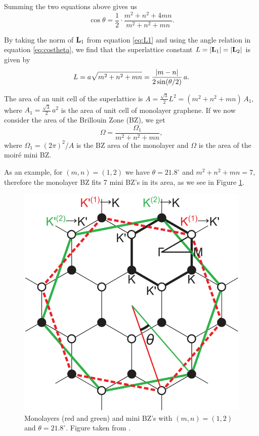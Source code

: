 \documentclass[12pt]{report}
\begin{document}
Summing the two equations above gives us
\begin{equation} \label{eq:costheta}
\cos\theta = \frac{1}{2} \cdot \frac{m^2 + n^2 + 4mn}{m^2 + n^2 + mn}.
\end{equation}


By taking the norm of $\vb{L}_1$ from equation \ref{eq:L1} and using the angle relation in equation \ref{eq:costheta}, we find that the superlattice constant $L = \abs{\vb{L}_1} = \abs{\vb{L}_2}$ is given by
\begin{equation} \label{eq:}
L = a\sqrt{m^2 + n^2 + mn} = \frac{\abs{m-n}}{2 \sin(\theta/2)} \, a.
\end{equation}

The area of an unit cell of the superlattice is $A = \frac{\sqrt{3}}{2} L^2 = (m^2 + n^2 + mn) \, A_1$, where $A_1 = \frac{\sqrt{3}}{2} \, a^2$ is the area of unit cell of monolayer graphene. If we now consider the area of the Brillouin Zone (BZ), we get
\begin{equation} \label{eq:bz-volume}
\Omega = \frac{\Omega_1}{m^2 + n^2 + mn},
\end{equation}
where $\Omega_1 = (2\pi)^2/A$ is the BZ area of the monolayer and $\Omega$ is the area of the moiré mini BZ.

As an example, for $(m,n) = (1,2)$ we have $\theta = 21.8^\circ$ and $m^2 + n^2 + mn = 7$, therefore the monolayer BZ fits 7 mini BZ's in its area, as we see in Figure \ref{fig:bzminibz}.
\begin{figure}[H]
\centering
\includegraphics[width=0.5\linewidth]{fig/tbg/bzminibz.png}
\caption{Monolayers (red and green) and mini BZ's with $(m,n) = (1,2)$ and $\theta = 21.8^\circ$. Figure taken from \cite{koshino2012}.}
\label{fig:bzminibz}
\end{figure}
\end{document}
